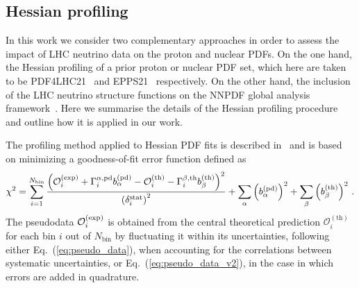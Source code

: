 \subsection{Hessian profiling}
\label{sec:profiling}

In this work we consider two complementary approaches in order to assess the
impact of LHC neutrino data on the proton and nuclear PDFs.
%
On the one hand, the Hessian profiling of a prior proton or
nuclear PDF set, which here are taken to be PDF4LHC21~\cite{PDF4LHCWorkingGroup:2022cjn} and
EPPS21~\cite{Eskola:2021nhw} respectively.
%
On the other hand, the inclusion of the LHC neutrino structure functions
on the NNPDF global analysis framework~\cite{NNPDF:2021uiq,NNPDF:2021njg}.
%
Here we summarise the details of the Hessian profiling procedure and
outline how it is applied in our work.

The profiling method applied to Hessian PDF fits is described in~\cite{Paukkunen:2014zia, Schmidt:2018hvu, AbdulKhalek:2018rok, HERAFitterdevelopersTeam:2015cre} and is based
on minimizing a goodness-of-fit error function defined as
\begin{equation}
\chi^2 = 
\sum_{i=1}^{N_{\textrm{bin}}} 
{{\left(  \mathcal{O}_i^{\rm (exp)}
            + \Gamma_i^{\alpha,\textrm{pd}}
              b_\alpha^{\textrm{(pd)}}
            - \mathcal{O}_i^{\rm (th)}
            - \Gamma_i^{\beta,\textrm{th}}
              b_\beta^{(\textrm{th})}
     \right)^2
     }\over { \left(\delta_i^{\rm stat}\right)^2 }}
+ \sum_\alpha \left( b_\alpha^{(\textrm{pd})}\right)^2
+ \sum_\beta  \left( b_\beta^{\textrm{(th)}}\right) ^2 \, .
\label{eq:profilingchi2}
\end{equation}
The pseudodata 
$\mathcal{O}_i^{\rm (exp)}$ 
is obtained from the central theoretical prediction 
$\mathcal{O}_i^{(\textrm{th})}$
for each bin $i$ out of $N_{\textrm{bin}}$ by fluctuating
it within its uncertainties, following either
Eq.~(\ref{eq:pseudo_data}), when accounting for the correlations
between systematic uncertainties, or Eq.~(\ref{eq:pseudo_data_v2}),
in the case in which errors are added in quadrature.

